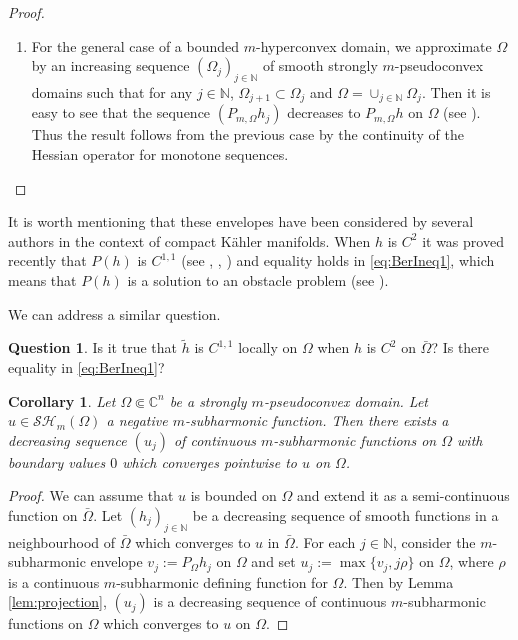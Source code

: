 \documentclass[JEP,XML,SOM,Unicode]{cedram}
\newtheorem{corollary}[theorem]{Corollary}
\theoremstyle{definition}
\newtheorem*{Question}{Question}
\newcommand{\N}{\mathbb{N}}
\renewcommand{\C}{\mathbb{C}}
\begin{document}
\begin{proof}
\begin{enumerate}
Summarizing, we have proved that for any $j \in \N$, $\psi_j \leq u_j \leq \tilde h $ on $\Omega$.
Therefore,
\[
0 \leq \tilde h - u_j \leq \tilde h - \psi_j = (1 \slash j) ( \tilde h - \psi + m \log j)\quad\text{on $\Omega$ for any $j \in \N^*$}.
\]
This proves that $u_j$ converges to $\tilde h$ uniformly on $\Omega$. Then since $u_j \leq h$ on $\Omega$, taking the limit as $j \to + \infty$ in \eqref{eq:BerEqu} we obtain inequality \eqref{eq:BerIneq2} by the continuity of the Hessian operators for uniform convergence (see \cite{Lu12}).

\item
For the general case of a bounded $m$-hyperconvex domain, we approximate $\Omega$ by an increasing sequence $(\Omega_j)_{j \in \N}$ of smooth strongly $m$-pseudoconvex domains such that for any $j \in \N$, $\Omega_{j + 1} \subset \Omega_j$ and $\Omega = \cup_{j \in \N} \Omega_j$.
Then it is easy to see that the sequence $(P_{m,\Omega} h_j)$ decreases to $P_{m,\Omega} h$ on $\Omega$ (see \cite{GLZ19}). Thus the result follows from the previous case by the continuity of the Hessian operator for monotone sequences.\qedhere
\end{enumerate}
\end{proof}

It is worth mentioning that these envelopes have been considered by several authors in the context of compact Kähler manifolds. When $h$ is $C^2$ it was proved recently that $P (h)$ is $C^{1,1}$ (see \cite{ChZh17}, \cite{T18}, \cite{Ber19}) and equality holds in \eqref{eq:BerIneq1}, which means that $P(h)$ is a solution to an obstacle problem (see \cite{BD12}).

We can address a similar question.

\begin{Question}
Is it true that $\tilde h$ is $C^{1,1}$ locally on $\Omega$ when $h$ is $C^2$ on $\bar \Omega$? Is there equality in \eqref{eq:BerIneq1}?
\end{Question}

\begin{corollary} \label{cor:smoothing} Let $\Omega \Subset \C^n$ be a strongly $m$-pseudoconvex domain. Let $u \in \mathcal {SH}_m (\Omega)$ a negative $m$-subharmonic function. Then there exists a decreasing sequence $(u_j)$ of continuous $m$-subharmonic functions on $\Omega$ with boundary values $0$ which converges pointwise to $u$ on $\Omega$.
\end{corollary}

\begin{proof} We can assume that $u$ is bounded on $\Omega$ and extend it as a semi-continuous function on $\bar \Omega$. Let $(h_j)_{j \in \N}$ be a decreasing sequence of smooth functions in a neighbourhood of $\bar \Omega$ which converges to $u$ in $\bar \Omega$.
For each $j \in \N$, consider the $m$-subharmonic envelope
$v_j:= P_{\Omega} h_j$ on $\Omega$ and set $u_j:= \max \{v_j, j \rho\}$ on $\Omega$, where $\rho$ is a continuous $m$-subharmonic defining function for $\Omega$. Then by Lemma \ref{lem:projection}, $(u_j)$ is a decreasing sequence of continuous $m$-subharmonic functions on $\Omega$ which converges to $u$ on $\Omega$.
\end{proof}
\end{document}
